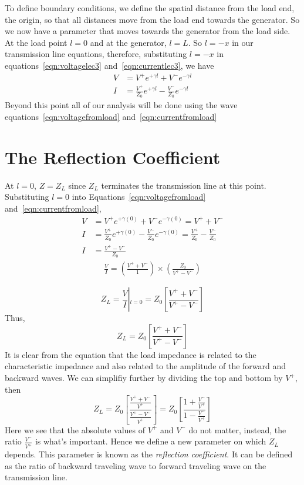 To define boundary conditions, we define the spatial distance from the load end, the origin, so that all distances move from the load end towards the generator. So we now have a parameter that moves towards the generator from the load side. At the load point $l = 0$ and at the generator, $l = L$. So $l = -x$ in our transmission line equations, therefore, substituting $l = -x$ in equations~\ref{eqn:voltagelec3} and~\ref{eqn:currentlec3}, we have
\begin{align}
V &= V^+e^{+\gamma l}+V^-e^{-\gamma l}
\label{eqn:voltagefromload}\\
I &= \frac{V^+}{Z_0}e^{+\gamma l}-\frac{V^-}{Z_0}e^{-\gamma l}
\label{eqn:currentfromload}
\end{align}
Beyond this point all of our analysis will be done using the wave equations~\eqref{eqn:voltagefromload} and~\eqref{eqn:currentfromload}

\section{The Reflection Coefficient}
At $l = 0$, $Z = Z_L$ since $Z_L$ terminates the transmission line at this point. Substituting $l = 0$ into Equations~\eqref{eqn:voltagefromload} and~\eqref{eqn:currentfromload},
\begin{align*}
V &= V^+e^{+\gamma (0)}+V^-e^{-\gamma (0)} = V^+ + V^-\\
I &= \frac{V^+}{Z_0}e^{+\gamma (0)}-\frac{V^-}{Z_0}e^{-\gamma (0)} = \frac{V^+}{Z_0} - \frac{V^-}{Z_0} \\
I &= \frac{V^+ - V^-}{Z_0}
\end{align*}
\begin{align*}
\frac{V}{I} = \left( \frac{V^+ + V^-}{1}\right)  \times \left( \frac{Z_0}{V^+ - V^-}\right) 
\end{align*}

\begin{equation*}
Z_{L} = \frac{V}{I}\left|_{l = 0} = Z_0 \left[ \frac{V^+ + V^-}{V^+ - V^-} \right]\right.    
\end{equation*}
Thus,
\begin{equation}
Z_L = Z_0 \left[\frac{V^+ + V^-}{V^+ - V^-} \right]
\end{equation}
It is clear from the equation that the load impedance is related to the characteristic impedance and also related to the amplitude of the forward and backward waves. We can simplifiy further by dividing the top and bottom by $V^+$, then
\begin{dmath}
Z_L = Z_0\left[ \frac{\frac{V^+ + V^-}{V^+}}{\frac{V^+ - V^-}{V^+}}\right]
= Z_0\left[ \frac{1+ \frac{V^-}{V^+}}{1 - \frac{V^-}{V^+}}\right] 
\label{eqn:impedatload}
\end{dmath}
Here we see that the absolute values of $V^+$ and $V^-$ do not matter, instead, the ratio $\frac{V^-}{V^+}$ is what's important. Hence we define a new parameter on which $Z_L$ depends. This parameter is known as the \emph{reflection coefficient}. It can be defined as the ratio of backward traveling wave to forward traveling wave on the transmission line.

